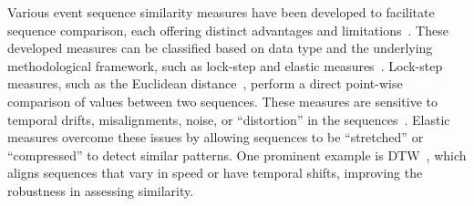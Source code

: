 \documentclass[preprint,journal]{vgtc}            %
\begin{document}
Various event sequence similarity measures have been developed to facilitate sequence comparison, each offering distinct advantages and limitations~\cite{Sabrina08Distance, Studer15What}.
These developed measures can be classified based on data type and the underlying methodological framework, such as lock-step and elastic measures~\cite{Ding08Querying, Saeed15Time, Saeed06Novel, Zielezinski17Alignment}.
Lock-step measures, such as the Euclidean distance~\cite{Faloutsos94Fast}, perform a direct point-wise comparison of values between two sequences.
These measures are sensitive to temporal drifts, misalignments, noise, or ``distortion'' in the sequences~\cite{Ratanamahatana05Novel}.
Elastic measures overcome these issues by allowing sequences to be ``stretched'' or ``compressed'' to detect similar patterns.
One prominent example is DTW~\cite{Berndt94Using}, which aligns sequences that vary in speed or have temporal shifts, improving the robustness in assessing similarity.

\end{document}
